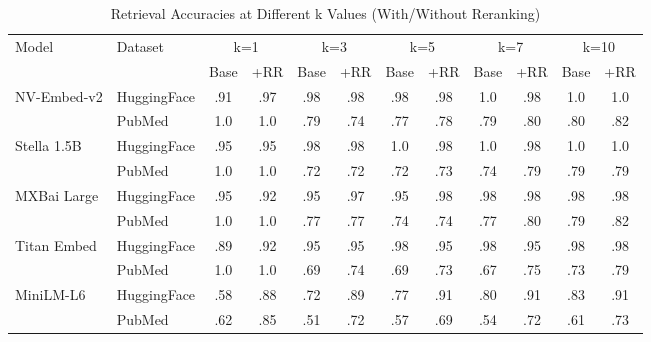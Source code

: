 \documentclass{scrartcl}
\begin{document}
\begin{table}[H]
    \centering
    \caption{Retrieval Accuracies at Different k Values (With/Without Reranking)}
    \tiny
    \begin{tabular}{ll|cc|cc|cc|cc|cc}
    \hline
    \multirow{2}{*}{Model} & \multirow{2}{*}{Dataset} & \multicolumn{2}{c|}{k=1} & \multicolumn{2}{c|}{k=3} & \multicolumn{2}{c|}{k=5} & \multicolumn{2}{c|}{k=7} & \multicolumn{2}{c}{k=10} \\
    \cline{3-12}
    & & Base & +RR & Base & +RR & Base & +RR & Base & +RR & Base & +RR \\
    \hline
    NV-Embed-v2 & HuggingFace & .91 & .97 & .98 & .98 & .98 & .98 & 1.0 & .98 & 1.0 & 1.0 \\
    & PubMed & 1.0 & 1.0 & .79 & .74 & .77 & .78 & .79 & .80 & .80 & .82 \\
    \hline
    Stella 1.5B & HuggingFace & .95 & .95 & .98 & .98 & 1.0 & .98 & 1.0 & .98 & 1.0 & 1.0 \\
    & PubMed & 1.0 & 1.0 & .72 & .72 & .72 & .73 & .74 & .79 & .79 & .79 \\
    \hline
    MXBai Large & HuggingFace & .95 & .92 & .95 & .97 & .95 & .98 & .98 & .98 & .98 & .98 \\
    & PubMed & 1.0 & 1.0 & .77 & .77 & .74 & .74 & .77 & .80 & .79 & .82 \\
    \hline
    Titan Embed & HuggingFace & .89 & .92 & .95 & .95 & .98 & .95 & .98 & .95 & .98 & .98 \\
    & PubMed & 1.0 & 1.0 & .69 & .74 & .69 & .73 & .67 & .75 & .73 & .79 \\
    \hline
    MiniLM-L6 & HuggingFace & .58 & .88 & .72 & .89 & .77 & .91 & .80 & .91 & .83 & .91 \\
    & PubMed & .62 & .85 & .51 & .72 & .57 & .69 & .54 & .72 & .61 & .73 \\
    \hline
    \end{tabular}
    \label{tab:retrieval_accuracies}
\end{table}
\end{document}
